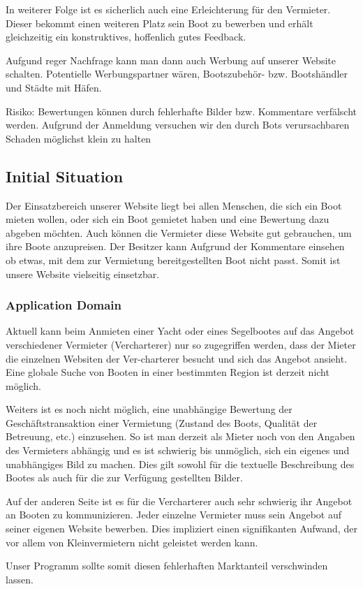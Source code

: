 \documentclass[12pt]{article}
\theoremstyle{definition}
\newenvironment{explanation}{%
   \setlength{\parindent}{0pt}
   \itshape
   \color{blue}
}{}
\begin{document}
\begin{explanation}
	In weiterer Folge ist es sicherlich auch eine Erleichterung für den Vermieter. Dieser bekommt einen weiteren Platz sein Boot zu bewerben und erhält gleichzeitig ein konstruktives, hoffenlich gutes Feedback.
	
	Aufgund reger Nachfrage kann man dann auch Werbung auf unserer Website schalten. Potentielle Werbungspartner wären, Bootszubehör- bzw. Bootshändler und Städte mit Häfen.
	
	Risiko:
	Bewertungen können durch fehlerhafte Bilder bzw. Kommentare verfälscht werden. Aufgrund der Anmeldung versuchen wir den durch Bots verursachbaren Schaden möglichst klein zu halten	
\end{explanation}

\subsection{Initial Situation}
\begin{explanation}
	Der Einsatzbereich unserer Website liegt bei allen Menschen, die sich ein Boot mieten wollen, oder sich ein Boot gemietet haben und eine Bewertung dazu abgeben möchten.
	Auch können die Vermieter diese Website gut gebrauchen, um ihre Boote anzupreisen.
	Der Besitzer kann Aufgrund der Kommentare einsehen ob etwas, mit dem zur Vermietung bereitgestellten Boot nicht passt. Somit ist unsere Website vielseitig einsetzbar.	
\end{explanation}

\subsubsection{Application Domain}
\begin{explanation}
	Aktuell kann beim Anmieten einer Yacht oder eines Segelbootes auf das Angebot verschiedener Vermieter (Vercharterer) nur so zugegriffen werden, dass der Mieter die einzelnen Websiten der Ver-charterer besucht und sich das Angebot ansieht. Eine globale Suche von Booten in einer bestimmten Region ist derzeit nicht möglich. 

	Weiters ist es noch nicht möglich, eine unabhängige Bewertung der Geschäfts\-trans\-aktion einer Vermietung (Zustand des Boots, Qualität der Betreuung, etc.) einzusehen. So ist man derzeit als Mieter noch von den Angaben des Vermieters abhängig und es ist schwierig bis unmöglich, sich ein eigenes und unabhängiges Bild zu machen. Dies gilt sowohl für die textuelle Beschreibung des Bootes als auch für die zur Verfügung gestellten Bilder.
	
	Auf der anderen Seite ist es für die Vercharterer auch sehr schwierig ihr Angebot an Booten zu kommunizieren. Jeder einzelne Vermieter muss sein Angebot auf seiner eigenen Website bewerben. Dies impliziert einen signifikanten Aufwand, der vor allem von Kleinvermietern nicht geleistet werden kann. 
	
	Unser Programm sollte somit diesen fehlerhaften Marktanteil verschwinden lassen.
	
\end{explanation}
\end{document}
